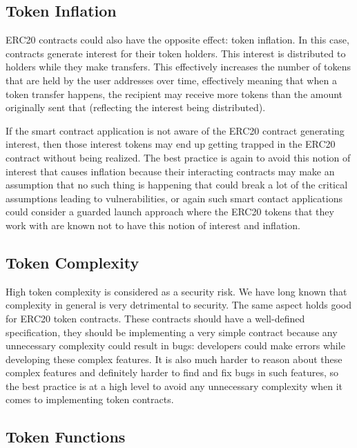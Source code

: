 \subsection{Token Inflation}\label{token-inflation}

ERC20 contracts could also have the opposite effect: token inflation. In
this case, contracts generate interest for their token holders. This
interest is distributed to holders while they make transfers. This
effectively increases the number of tokens that are held by the user
addresses over time, effectively meaning that when a token transfer
happens, the recipient may receive more tokens than the amount
originally sent that (reflecting the interest being distributed).

If the smart contract application is not aware of the ERC20 contract
generating interest, then those interest tokens may end up getting
trapped in the ERC20 contract without being realized. The best practice
is again to avoid this notion of interest that causes inflation because
their interacting contracts may make an assumption that no such thing is
happening that could break a lot of the critical assumptions leading to
vulnerabilities, or again such smart contact applications could consider
a guarded launch approach where the ERC20 tokens that they work with are
known not to have this notion of interest and inflation.

\subsection{Token Complexity}\label{token-complexity}

High token complexity is considered as a security risk. We have long
known that complexity in general is very detrimental to security. The
same aspect holds good for ERC20 token contracts. These contracts should
have a well-defined specification, they should be implementing a very
simple contract because any unnecessary complexity could result in bugs:
developers could make errors while developing these complex features. It
is also much harder to reason about these complex features and
definitely harder to find and fix bugs in such features, so the best
practice is at a high level to avoid any unnecessary complexity when it
comes to implementing token contracts.

\subsection{Token Functions}\label{token-functions}

